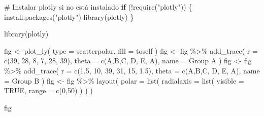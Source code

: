 \documentclass[
  spanish,
  letterpaper,
]{book}
\newenvironment{Shaded}{\begin{snugshade}}{\end{snugshade}}
\newcommand{\AttributeTok}[1]{\textcolor[rgb]{0.40,0.45,0.13}{#1}}
\newcommand{\CommentTok}[1]{\textcolor[rgb]{0.37,0.37,0.37}{#1}}
\newcommand{\ConstantTok}[1]{\textcolor[rgb]{0.56,0.35,0.01}{#1}}
\newcommand{\ControlFlowTok}[1]{\textcolor[rgb]{0.00,0.23,0.31}{\textbf{#1}}}
\newcommand{\DecValTok}[1]{\textcolor[rgb]{0.68,0.00,0.00}{#1}}
\newcommand{\FloatTok}[1]{\textcolor[rgb]{0.68,0.00,0.00}{#1}}
\newcommand{\FunctionTok}[1]{\textcolor[rgb]{0.28,0.35,0.67}{#1}}
\newcommand{\NormalTok}[1]{\textcolor[rgb]{0.00,0.23,0.31}{#1}}
\newcommand{\OtherTok}[1]{\textcolor[rgb]{0.00,0.23,0.31}{#1}}
\newcommand{\SpecialCharTok}[1]{\textcolor[rgb]{0.37,0.37,0.37}{#1}}
\newcommand{\StringTok}[1]{\textcolor[rgb]{0.13,0.47,0.30}{#1}}
\begin{document}
\begin{Shaded}
\begin{Highlighting}[]
\CommentTok{\# Instalar plotly si no está instalado}
\ControlFlowTok{if}\NormalTok{ (}\SpecialCharTok{!}\FunctionTok{require}\NormalTok{(}\StringTok{"plotly"}\NormalTok{)) \{}
  \FunctionTok{install.packages}\NormalTok{(}\StringTok{"plotly"}\NormalTok{)}
  \FunctionTok{library}\NormalTok{(plotly)}
\NormalTok{\}}

\FunctionTok{library}\NormalTok{(plotly)}

\NormalTok{fig }\OtherTok{\textless{}{-}} \FunctionTok{plot\_ly}\NormalTok{(}
    \AttributeTok{type =} \StringTok{\textquotesingle{}scatterpolar\textquotesingle{}}\NormalTok{,}
    \AttributeTok{fill =} \StringTok{\textquotesingle{}toself\textquotesingle{}}
\NormalTok{  )}
\NormalTok{fig }\OtherTok{\textless{}{-}}\NormalTok{ fig }\SpecialCharTok{\%\textgreater{}\%}
  \FunctionTok{add\_trace}\NormalTok{(}
    \AttributeTok{r =} \FunctionTok{c}\NormalTok{(}\DecValTok{39}\NormalTok{, }\DecValTok{28}\NormalTok{, }\DecValTok{8}\NormalTok{, }\DecValTok{7}\NormalTok{, }\DecValTok{28}\NormalTok{, }\DecValTok{39}\NormalTok{),}
    \AttributeTok{theta =} \FunctionTok{c}\NormalTok{(}\StringTok{\textquotesingle{}A\textquotesingle{}}\NormalTok{,}\StringTok{\textquotesingle{}B\textquotesingle{}}\NormalTok{,}\StringTok{\textquotesingle{}C\textquotesingle{}}\NormalTok{, }\StringTok{\textquotesingle{}D\textquotesingle{}}\NormalTok{, }\StringTok{\textquotesingle{}E\textquotesingle{}}\NormalTok{, }\StringTok{\textquotesingle{}A\textquotesingle{}}\NormalTok{),}
    \AttributeTok{name =} \StringTok{\textquotesingle{}Group A\textquotesingle{}}
\NormalTok{  )}
\NormalTok{fig }\OtherTok{\textless{}{-}}\NormalTok{ fig }\SpecialCharTok{\%\textgreater{}\%}
  \FunctionTok{add\_trace}\NormalTok{(}
    \AttributeTok{r =} \FunctionTok{c}\NormalTok{(}\FloatTok{1.5}\NormalTok{, }\DecValTok{10}\NormalTok{, }\DecValTok{39}\NormalTok{, }\DecValTok{31}\NormalTok{, }\DecValTok{15}\NormalTok{, }\FloatTok{1.5}\NormalTok{),}
    \AttributeTok{theta =} \FunctionTok{c}\NormalTok{(}\StringTok{\textquotesingle{}A\textquotesingle{}}\NormalTok{,}\StringTok{\textquotesingle{}B\textquotesingle{}}\NormalTok{,}\StringTok{\textquotesingle{}C\textquotesingle{}}\NormalTok{, }\StringTok{\textquotesingle{}D\textquotesingle{}}\NormalTok{, }\StringTok{\textquotesingle{}E\textquotesingle{}}\NormalTok{, }\StringTok{\textquotesingle{}A\textquotesingle{}}\NormalTok{),}
    \AttributeTok{name =} \StringTok{\textquotesingle{}Group B\textquotesingle{}}
\NormalTok{  )}
\NormalTok{fig }\OtherTok{\textless{}{-}}\NormalTok{ fig }\SpecialCharTok{\%\textgreater{}\%}
  \FunctionTok{layout}\NormalTok{(}
    \AttributeTok{polar =} \FunctionTok{list}\NormalTok{(}
      \AttributeTok{radialaxis =} \FunctionTok{list}\NormalTok{(}
        \AttributeTok{visible =} \ConstantTok{TRUE}\NormalTok{,}
        \AttributeTok{range =} \FunctionTok{c}\NormalTok{(}\DecValTok{0}\NormalTok{,}\DecValTok{50}\NormalTok{)}
\NormalTok{      )}
\NormalTok{    )}
\NormalTok{  )}

\NormalTok{fig}
\end{Highlighting}
\end{Shaded}
\end{document}
